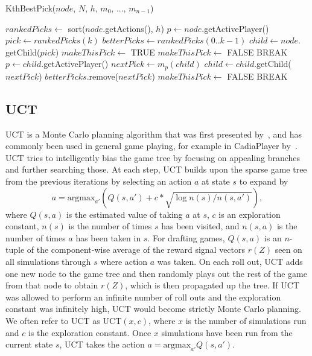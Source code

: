 \documentclass[letterpaper]{article}
\numberwithin{equation}{section}
\numberwithin{theorem}{section}
\numberwithin{lemma}{section}
\numberwithin{df}{section}
\begin{document}
\begin{algorithm}[t]
	\caption{KthBestPick($node$, $N$, $h$, $m_0$, ..., $m_{n-1}$)}
	\label{alg:kth}
	\begin{footnotesize}
	\begin{algorithmic}[1]
		\STATE $rankedPicks \gets $ sort($node$.getActions(), $h$)
		\STATE $p \gets node$.getActivePlayer()
			\STATE $pick \gets rankedPicks(k)$
			\STATE $betterPicks \gets rankedPicks(0..k-1)$
			\STATE $child \gets node.$getChild($pick$)
			\STATE $makeThisPick \gets $ TRUE
					\STATE $makeThisPick \gets $ FALSE
					\STATE BREAK
				\ENDIF
				\STATE $p \gets child$.getActivePlayer()
				\STATE $nextPick \gets m_p(child)$
				\STATE $child \gets child.$getChild($nextPick$)
						\STATE $betterPicks.$remove($nextPick$)
					\ELSE
						\STATE $makeThisPick \gets $ FALSE
						\STATE BREAK
					\ENDIF
				\ENDIF
			\ENDWHILE
			\ENDIF
		\ENDFOR
	\end{algorithmic}
	\end{footnotesize}
\end{algorithm}

\subsection{UCT}

UCT is a Monte Carlo planning algorithm that was first presented by~\cite{UCT}, and has commonly been used in general game playing, for example in CadiaPlayer by~\cite{Cadia}. 
UCT tries to intelligently bias the game tree by focusing on appealing branches and further searching those. At each step, UCT builds upon the sparse game tree from the previous iterations by selecting an action $a$ at state $s$ to expand by
\[ a = \text{argmax}_{a'} \left( Q(s,a') + c* \sqrt{ \log n(s) / n(s,a') } \right), \]
where $Q(s,a)$ is the estimated value of taking $a$ at $s$, $c$ is an exploration constant, $n(s)$ is the number of times $s$ has been visited, and $n(s,a)$ is the number of times $a$ has been taken in $s$.  For drafting games, $Q(s,a)$ is an $n$-tuple of the component-wise average of the reward signal vectors $r(Z)$ seen on all simulations through $s$ where action $a$ was taken.  On each roll out, UCT adds one new node to the game tree and then randomly plays out the rest of the game from that node to obtain $r(Z)$, which is then propagated up the tree.  If UCT was allowed to perform an infinite number of roll outs and the exploration constant was infinitely high,  UCT would become strictly Monte Carlo planning.  We often refer to UCT as UCT$(x,c)$, where $x$ is the number of simulations run and $c$ is the exploration constant.  Once $x$ simulations have been run from the current state $s$, UCT takes the action $a = \text{argmax}_{a'}Q(s,a')$.
\end{document}
